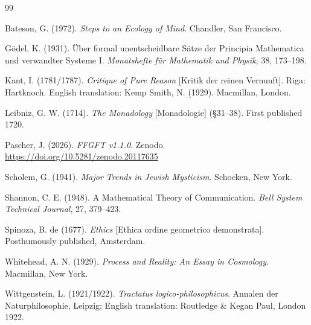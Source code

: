\begin{thebibliography}{99}

Bateson, G. (1972). \emph{Steps to an Ecology of Mind}. Chandler, San Francisco.

Gödel, K. (1931). Über formal unentscheidbare Sätze der Principia Mathematica und verwandter Systeme I. \emph{Monatshefte für Mathematik und Physik}, 38, 173--198.

Kant, I. (1781/1787). \emph{Critique of Pure Reason} [Kritik der reinen Vernunft]. Riga: Hartknoch. English translation: Kemp Smith, N. (1929). Macmillan, London.

Leibniz, G. W. (1714). \emph{The Monadology} [Monadologie] (§31--38). First published 1720.

Pascher, J. (2026). \emph{FFGFT v1.1.0}. Zenodo. \url{https://doi.org/10.5281/zenodo.20117635}

Scholem, G. (1941). \emph{Major Trends in Jewish Mysticism}. Schocken, New York.

Shannon, C. E. (1948). A Mathematical Theory of Communication. \emph{Bell System Technical Journal}, 27, 379--423.

Spinoza, B. de (1677). \emph{Ethics} [Ethica ordine geometrico demonstrata]. Posthumously published, Amsterdam.

Whitehead, A. N. (1929). \emph{Process and Reality: An Essay in Cosmology}. Macmillan, New York.

Wittgenstein, L. (1921/1922). \emph{Tractatus logico-philosophicus}. Annalen der Naturphilosophie, Leipzig; English translation: Routledge \& Kegan Paul, London 1922.

\end{thebibliography}
